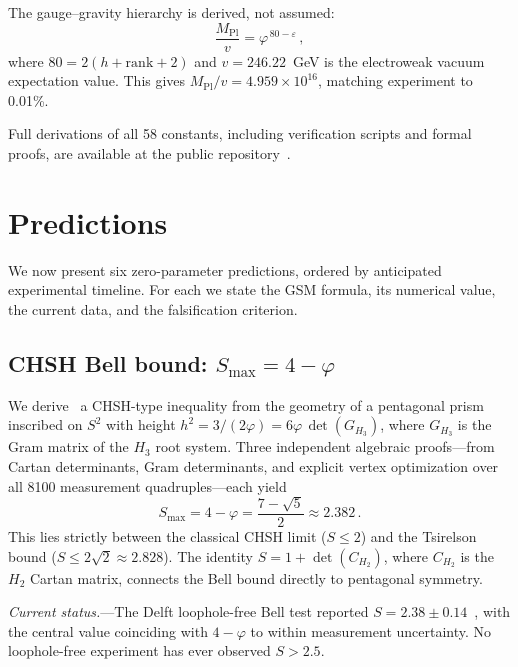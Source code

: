 \documentclass[aps,prl,twocolumn,superscriptaddress,nofootinbib]{revtex4-2}
\newcommand{\vp}{\varphi}
\newcommand{\eps}{\varepsilon}
\begin{document}
The gauge--gravity hierarchy is derived, not assumed:
\begin{equation}
  \frac{M_{\mathrm{Pl}}}{v} = \vp^{\,80 - \eps}\,,
  \label{eq:hierarchy}
\end{equation}
where $80 = 2(h + \mathrm{rank} + 2)$ and $v = 246.22$~GeV is the
electroweak vacuum expectation value.  This gives
$M_{\mathrm{Pl}}/v = 4.959 \times 10^{16}$, matching experiment to 0.01\%.

Full derivations of all 58 constants, including verification scripts and
formal proofs, are available at the public repository~\cite{mcgirl2026gsm}.

\section{Predictions}

We now present six zero-parameter predictions, ordered by anticipated
experimental timeline.  For each we state the GSM formula, its numerical
value, the current data, and the falsification criterion.

\subsection{CHSH Bell bound: $S_{\max} = 4 - \vp$}
\label{sec:bell}

We derive~\cite{mcgirl2026bell} a CHSH-type inequality from the geometry
of a pentagonal prism inscribed on $S^2$ with height
$h^2 = 3/(2\vp) = 6\vp\,\det(G_{H_3})$, where $G_{H_3}$ is the
Gram matrix of the $H_3$ root system.  Three independent algebraic
proofs---from Cartan determinants, Gram determinants, and explicit
vertex optimization over all 8100 measurement quadruples---each yield
\begin{equation}
  S_{\max} = 4 - \vp = \frac{7-\sqrt{5}}{2} \approx 2.382\,.
  \label{eq:bell}
\end{equation}
This lies strictly between the classical CHSH limit ($S \le 2$) and the
Tsirelson bound ($S \le 2\sqrt{2} \approx 2.828$).
The identity $S = 1 + \det(C_{H_2})$, where $C_{H_2}$ is the $H_2$ Cartan
matrix, connects the Bell bound directly to pentagonal symmetry.

\emph{Current status.}---The Delft loophole-free Bell test reported
$S = 2.38 \pm 0.14$~\cite{hensen2015}, with the central value coinciding with
$4 - \vp$ to within measurement uncertainty.  No loophole-free experiment has
ever observed $S > 2.5$.
\end{document}
